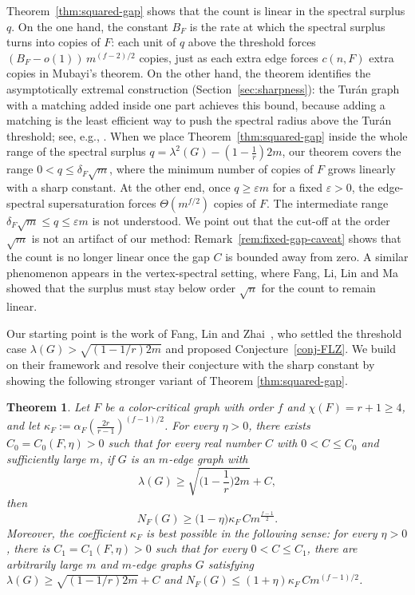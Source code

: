 \documentclass[11pt,a4paper]{article}
\newtheorem{theorem}{Theorem}[section]
\theoremstyle{definition}
\theoremstyle{plain}
\newcommand{\Ksharp}{\kappa_{F}}
\renewcommand{\le}{\leqslant}
\renewcommand{\ge}{\geqslant}
\begin{document}
Theorem~\ref{thm:squared-gap} 
shows that the count is linear in the spectral
surplus $q$. On the one hand, the constant
$B_F$ is the rate at which the spectral surplus
turns into copies of $F$: each unit of $q$
above the threshold forces
$(B_F-o(1))\,m^{(f-2)/2}$ copies, just as each
extra edge forces $c(n,F)$ extra copies in
Mubayi's theorem. 
On the other hand, the
theorem identifies the asymptotically extremal construction (Section~\ref{sec:sharpness}): the Tur\'an graph with a matching added
inside one part  achieves this bound, because adding a matching is the least efficient way to push the spectral radius above the Tur\'{a}n threshold; see, e.g.,  \cite{FLLM2025}. 
When we place Theorem~\ref{thm:squared-gap} inside the whole range
of the spectral surplus $q=\lambda^2(G)-(1-\frac1r)2m$, our theorem
covers the range $0<q\le\delta_F\sqrt m$, where the minimum number of copies of
$F$ grows linearly  with a sharp constant. At
the other end, once $q\ge\varepsilon m$ for a fixed $\varepsilon>0$, the edge-spectral supersaturation forces
$\Theta(m^{f/2})$ copies of $F$. The intermediate range
$\delta_F\sqrt m\le q\le\varepsilon m$ is not understood. 
We point out that the cut-off at the order $\sqrt m$ is not an artifact of our method: Remark~\ref{rem:fixed-gap-caveat} shows that the count is no longer linear once the gap $C$ is bounded away from zero. A similar phenomenon appears in the vertex-spectral setting, where Fang, Li, Lin and Ma \cite{FLLM2025} showed that the surplus must stay below order $\sqrt n$ for the count to remain linear. 

\smallskip 
Our starting point is the work of Fang,
Lin and Zhai~\cite{FLZ}, who settled the
threshold case $\lambda(G) \!>\! \sqrt{(1\!-\!1/r)2m}$ 
and proposed 
Conjecture~\ref{conj-FLZ}. 
We build on their framework and resolve their conjecture
with the sharp constant by showing the following stronger variant of Theorem \ref{thm:squared-gap}. 


\begin{theorem}\label{thm:linear-small-gap}
Let $F$ be a color-critical graph with  order $f$ and $\chi(F)=r+1\ge4$, and let 
$ \Ksharp:=\alpha_F (\frac{2r}{r-1} )^{(f-1)/2}$.
For every $\eta>0$, there exists $C_0=C_0(F,\eta)>0$ such that for every real number $C$ with $0<C\le C_0$ and sufficiently large $m$, if $G$ is an $m$-edge graph with  
$$  \lambda(G)\ge \sqrt{\Big(1- \frac{1}{r}\Big)2m}+C, $$
then
\[
   N_F (G)\ge
  \big(1 - \eta \big) \Ksharp \,C m^{\frac{f-1}{2}}.
\]
Moreover, the coefficient $\Ksharp$ is best possible in the following sense: for every $\eta>0$, there is $C_1=C_1(F,\eta)>0$ such that  for every $0<C\le C_1$, there are arbitrarily large $m$ and $m$-edge graphs $G$ satisfying $\lambda(G)\ge\sqrt{\left( 1 \!-\! {1}/{r}\right)2m} +C$ and
$  N_F (G)\le (1+\eta)\Ksharp\, C m^{(f-1)/2}$.  
\end{theorem}
\end{document}
